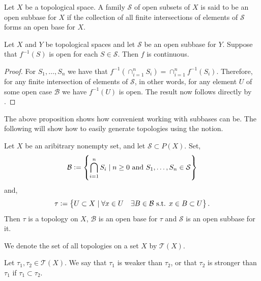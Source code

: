 \documentclass[11pt,a4paper]{article}
\begin{document}
\begin{definition}
  Let $X$ be a topological space. A family $\mathcal{S}$ of open subsets 
  of $X$ is said to be an open subbase for $X$ if the collection of all 
  finite intersections of elements of $\mathcal{S}$ forms an open base 
  for $X$.
\end{definition}

\begin{proposition}
  Let $X$ and $Y$ be topological spaces and let $\mathcal{S}$ be an open
  subbase for $Y$.
  Suppose that $f^{-1}(S)$ is open for each $S \in \mathcal{S}$.
  Then $f$ is continuous.
\end{proposition}
\begin{proof}
  For $S_1,\dots,S_n$ we have that 
  $f^{-1}(\cap_{i=1}^{n} S_i) = \cap_{i=1}^{n} f^{-1}(S_i)$.
  Therefore, for any finite intersection of elements of $\mathcal S$,
  in other words, for any element $U$ of some open case $\mathcal B$
  we have $f^{-1}(U)$ is open. The result now follows directly by 
  .
\end{proof}

\begin{remark}
  The above proposition shows how convenient working with subbases can be.
  The following will show how to easily generate topologies using the notion.
\end{remark}

\begin{proposition}
  Let $X$ be an aribitrary nonempty set, 
  and let $\mathcal{S} \subset P(X)$. Set,
  \[
    \mathcal{B} :=
    \left\{\bigcap_{i=1}^{n}{S_i} \mid n \geq 0 \textnormal{ and }
    S_1,\dots,S_n \in \mathcal{S}\right\}
  \]
  and,
  \[
    \tau := \left\{U \subset X \mid \forall x \in U \quad \exists B \in 
    \mathcal{B} \text{ s.t. } x \in B \subset U\right\}.
  \]
  Then $\tau$ is a topology on $X$, $\mathcal{B}$ is an open base for 
  $\tau$ and $\mathcal{S}$ is an open subbase for it.
\end{proposition}

\begin{remark}
  We denote the set of all topologies on a set $X$ by $\mathcal{T}(X)$.
\end{remark}

\begin{definition}
  Let $\tau_1,\tau_2 \in \mathcal{T}(X)$. We say that $\tau_1$ is weaker
  than $\tau_2$, or that $\tau_2$ is stronger than $\tau_1$ if 
  $\tau_1 \subset \tau_2$.
\end{definition}
\end{document}
